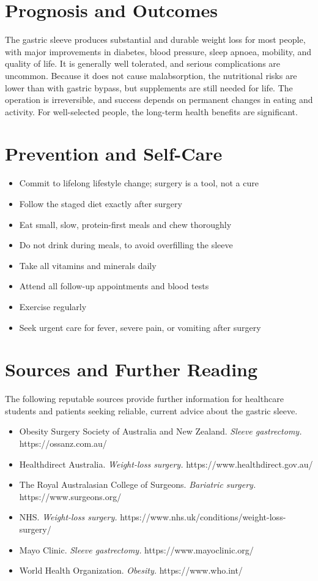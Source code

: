 \section*{Prognosis and Outcomes}
The gastric sleeve produces substantial and durable weight loss for most people, with major improvements in diabetes, blood pressure, sleep apnoea, mobility, and quality of life. It is generally well tolerated, and serious complications are uncommon. Because it does not cause malabsorption, the nutritional risks are lower than with gastric bypass, but supplements are still needed for life. The operation is irreversible, and success depends on permanent changes in eating and activity. For well-selected people, the long-term health benefits are significant.

\section*{Prevention and Self-Care}
\begin{itemize}
    \item Commit to lifelong lifestyle change; surgery is a tool, not a cure
    \item Follow the staged diet exactly after surgery
    \item Eat small, slow, protein-first meals and chew thoroughly
    \item Do not drink during meals, to avoid overfilling the sleeve
    \item Take all vitamins and minerals daily
    \item Attend all follow-up appointments and blood tests
    \item Exercise regularly
    \item Seek urgent care for fever, severe pain, or vomiting after surgery
\end{itemize}

\section*{Sources and Further Reading}
The following reputable sources provide further information for healthcare students and patients seeking reliable, current advice about the gastric sleeve.
\begin{itemize}
    \item Obesity Surgery Society of Australia and New Zealand. \textit{Sleeve gastrectomy.} https://ossanz.com.au/
    \item Healthdirect Australia. \textit{Weight-loss surgery.} https://www.healthdirect.gov.au/
    \item The Royal Australasian College of Surgeons. \textit{Bariatric surgery.} https://www.surgeons.org/
    \item NHS. \textit{Weight-loss surgery.} https://www.nhs.uk/conditions/weight-loss-surgery/
    \item Mayo Clinic. \textit{Sleeve gastrectomy.} https://www.mayoclinic.org/
    \item World Health Organization. \textit{Obesity.} https://www.who.int/
\end{itemize}
